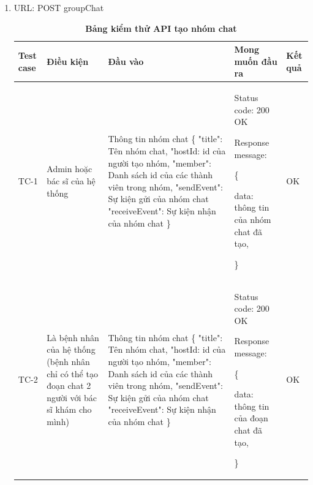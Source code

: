\begin{enumerate}
  \item URL: POST groupChat
    \begin{xltabular}{\textwidth}{
    | >{\raggedright\arraybackslash}p{1cm}
    | >{\raggedright\arraybackslash}p{2.5cm}
    | >{\raggedright\arraybackslash}X
    | >{\raggedright\arraybackslash}X
    | >{\raggedright\arraybackslash}p{1cm}|
    }
    \caption{\bfseries \fontsize{12pt}{0pt}\selectfont Bảng kiểm thử API tạo nhóm chat}
    \\
    \hline
    \bfseries Test case    &\bfseries Điều kiện   &\bfseries Đầu vào 
    &\bfseries Mong muốn đầu ra &\bfseries Kết quả\\ \hline
  
  
    TC-1
    & Admin hoặc bác sĩ của hệ thống
    & Thông tin nhóm chat
    \{
      "title": Tên nhóm chat,
      "hostId: id của người tạo nhóm,
      "member": Danh sách id của các thành viên trong nhóm,
      "sendEvent": Sự kiện gửi của nhóm chat
      "receiveEvent": Sự kiện nhận của nhóm chat
    \}
    & 
  
    Status code: 200 OK
  
      Response message:
  
      \{

    data: thông tin của nhóm chat đã tạo,
  
    \}
    
    & OK
  
    \\ \hline

    TC-2
    & Là bệnh nhân của hệ thống (bệnh nhân chỉ có thể tạo đoạn chat 2 người với bác sĩ khám cho mình)
    & Thông tin nhóm chat
    \{
      "title": Tên nhóm chat,
      "hostId: id của người tạo nhóm,
      "member": Danh sách id của các thành viên trong nhóm,
      "sendEvent": Sự kiện gửi của nhóm chat
      "receiveEvent": Sự kiện nhận của nhóm chat
    \}
    & 
  
    Status code: 200 OK
  
      Response message:
  
      \{

    data: thông tin của đoạn chat đã tạo,
  
    \}
    
    & OK
  
    \\ \hline
  
    \end{xltabular}


\end{enumerate}
